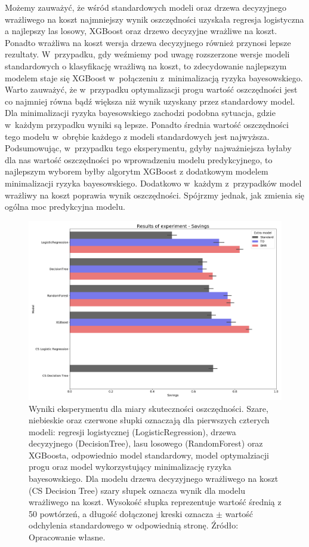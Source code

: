 \documentclass[inzynierska]{pwr_wmat_praca_dyplomowa}
\theoremstyle{plain}
\numberwithin{theorem}{chapter}
\theoremstyle{definition}
\numberwithin{theorem}{chapter}
\begin{document}
Możemy zauważyć, że wśród standardowych modeli oraz drzewa decyzyjnego wrażliwego na koszt najmniejszy wynik oszczędności uzyskała regresja logistyczna a najlepszy las losowy, XGBoost oraz drzewo decyzyjne wrażliwe na koszt. Ponadto wrażliwa na koszt wersja drzewa decyzyjnego również przynosi lepsze rezultaty. W~przypadku, gdy weźmiemy pod uwagę rozszerzone wersje modeli standardowych o klasyfikację wrażliwą na koszt, to zdecydowanie najlepszym modelem staje się XGBoost w~połączeniu z~minimalizacją ryzyka bayesowskiego. Warto zauważyć, że w~przypadku optymalizacji progu wartość oszczędności jest co najmniej równa bądź większa niż wynik uzyskany przez standardowy model. Dla minimalizacji ryzyka bayesowskiego zachodzi podobna sytuacja, gdzie w~każdym przypadku wyniki są lepsze. Ponadto średnia wartość oszczędności tego modelu w~obrębie każdego z modeli standardowych jest najwyższa. Podsumowując, w~przypadku tego eksperymentu, gdyby najważniejsza byłaby dla nas wartość oszczędności po wprowadzeniu modelu predykcyjnego, to najlepszym wyborem byłby algorytm XGBoost z dodatkowym modelem minimalizacji ryzyka bayesowskiego. Dodatkowo w~każdym z~przypadków model wrażliwy na koszt poprawia wynik oszczędności. Spójrzmy jednak, jak zmienia się ogólna moc predykcyjna modelu.

\begin{figure}[h]
	\includegraphics[width=\linewidth]{images/100_config1-Savings.png}
	\caption{Wyniki eksperymentu dla miary skuteczności oszczędności. Szare, niebieskie oraz czerwone słupki oznaczają dla pierwszych czterych modeli: regresji logistycznej (LogisticRegression), drzewa decyzyjnego (DecisionTree), lasu losowego (RandomForest) oraz XGBoosta, odpowiednio model standardowy, model optymalziacji progu oraz model wykorzystujący minimalizację ryzyka bayesowskiego. Dla modelu drzewa decyzyjnego wrażliwego na koszt (CS Decision Tree) szary słupek oznacza wynik dla modelu wrażliwego na koszt. Wysokość słupka reprezentuje wartość średnią z 50 powtórzeń, a długość dołączonej kreski oznacza $\pm$ wartość odchylenia standardowego w odpowiednią stronę. Źródło: Opracowanie własne.}
	\label{fig:results-savings}
\end{figure}
\end{document}
